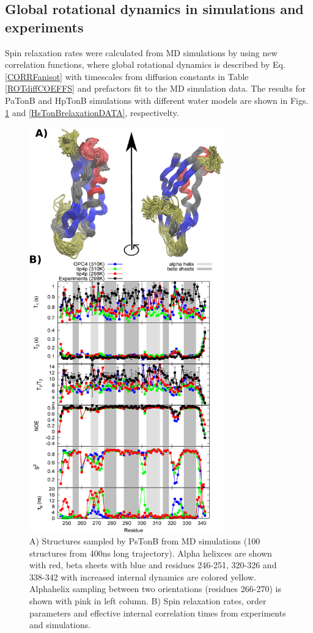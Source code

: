 \documentclass[pre,aps,floatfix,authordate1-4,twocolumn]{revtex4-1}
\begin{document}
\subsection{Global rotational dynamics in simulations and experiments}
Spin relaxation rates were calculated from MD simulations by using new correlation
functions, where global rotational dynamics is described by Eq. \ref{CORRFanisot}
with timescales from diffusion constants in Table \ref{ROTdiffCOEFFS} and prefactors
fit to the MD simulation data. The results for PaTonB and HpTonB simulations with different
water models are shown in Figs. \ref{PsTonBrelaxationDATA} and \ref{HsTonBrelaxationDATA},
respectivelty. 
\begin{figure}[!h]
  \includegraphics[width=8.5cm]{../Figs/RELdataPsTonB.eps}%
  \caption{A) Structures sampled by PsTonB from MD simulations
    (100 structures from 400ns long trajectory). Alpha helixces are
    shown with red, beta sheets with blue and residues 246-251, 320-326 and 338-342
    with increased internal dynamics are colored yellow.
    Alphahelix sampling between two orientations (residues 266-270) is shown with pink in left column.
    B) Spin relaxation rates, order parameters and effective internal correlation
    times from experiments and simulations.\label{PsTonBrelaxationDATA}}%
\end{figure}
\end{document}
